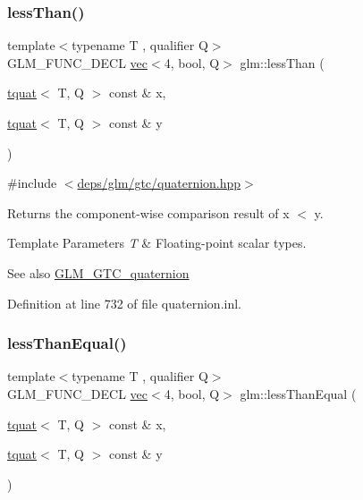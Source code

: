 \subsubsection{\texorpdfstring{less\+Than()}{lessThan()}}
{\footnotesize\ttfamily template$<$typename T , qualifier Q$>$ \\
G\+L\+M\+\_\+\+F\+U\+N\+C\+\_\+\+D\+E\+CL \hyperlink{structglm_1_1vec}{vec}$<$4, bool, Q$>$ glm\+::less\+Than (\begin{DoxyParamCaption}\item[{\hyperlink{structglm_1_1tquat}{tquat}$<$ T, Q $>$ const \&}]{x,  }\item[{\hyperlink{structglm_1_1tquat}{tquat}$<$ T, Q $>$ const \&}]{y }\end{DoxyParamCaption})}



{\ttfamily \#include $<$\hyperlink{gtc_2quaternion_8hpp}{deps/glm/gtc/quaternion.\+hpp}$>$}

Returns the component-\/wise comparison result of x $<$ y.


\begin{DoxyTemplParams}{Template Parameters}
{\em T} & Floating-\/point scalar types.\\
\hline
\end{DoxyTemplParams}
\begin{DoxySeeAlso}{See also}
\hyperlink{group__gtc__quaternion}{G\+L\+M\+\_\+\+G\+T\+C\+\_\+quaternion} 
\end{DoxySeeAlso}


Definition at line 732 of file quaternion.\+inl.

\mbox{\label{group__gtc__quaternion_ga9e84617bb109bf2eb7f30d7f4ba07ad4}} 
\subsubsection{\texorpdfstring{less\+Than\+Equal()}{lessThanEqual()}}
{\footnotesize\ttfamily template$<$typename T , qualifier Q$>$ \\
G\+L\+M\+\_\+\+F\+U\+N\+C\+\_\+\+D\+E\+CL \hyperlink{structglm_1_1vec}{vec}$<$4, bool, Q$>$ glm\+::less\+Than\+Equal (\begin{DoxyParamCaption}\item[{\hyperlink{structglm_1_1tquat}{tquat}$<$ T, Q $>$ const \&}]{x,  }\item[{\hyperlink{structglm_1_1tquat}{tquat}$<$ T, Q $>$ const \&}]{y }\end{DoxyParamCaption})}



